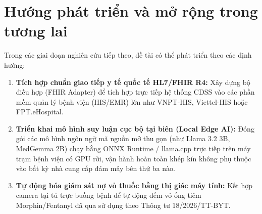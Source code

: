 \section{Hướng phát triển và mở rộng trong tương lai}
\label{sec:future_work}

Trong các giai đoạn nghiên cứu tiếp theo, đề tài có thể phát triển theo các định hướng:
\begin{enumerate}[leftmargin=1.5em]
    \item \textbf{Tích hợp chuẩn giao tiếp y tế quốc tế HL7/FHIR R4:} Xây dựng bộ điều hợp (FHIR Adapter) để tích hợp trực tiếp hệ thống CDSS vào các phần mềm quản lý bệnh viện (HIS/EMR) lớn như VNPT-HIS, Viettel-HIS hoặc FPT.eHospital.
    \item \textbf{Triển khai mô hình suy luận cục bộ tại biên (Local Edge AI):} Đóng gói các mô hình ngôn ngữ mã nguồn mở thu gọn (như Llama 3.2 3B, MedGemma 2B) chạy bằng ONNX Runtime / llama.cpp trực tiếp trên máy trạm bệnh viện có GPU rời, vận hành hoàn toàn khép kín không phụ thuộc vào bất kỳ nhà cung cấp đám mây bên thứ ba nào.
    \item \textbf{Tự động hóa giám sát nợ vỏ thuốc bằng thị giác máy tính:} Kết hợp camera tại tủ trực buồng bệnh để tự động đếm vỏ ống tiêm Morphin/Fentanyl đã qua sử dụng theo Thông tư 18/2026/TT-BYT.
\end{enumerate}
